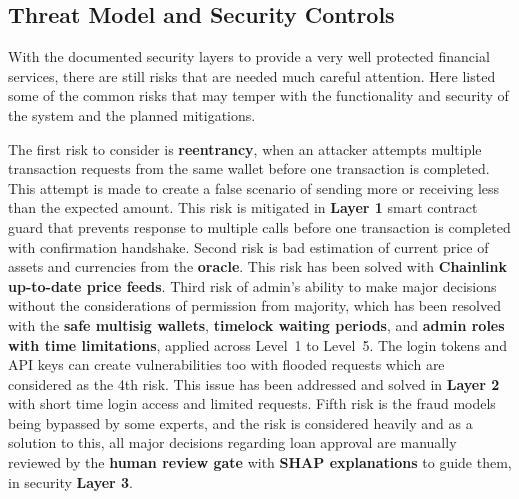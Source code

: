 \documentclass[12pt,a4paper]{report}
\begin{document}
\subsection{Threat Model and Security Controls}
\label{sec:threat-model}

With the documented security layers to provide a very well protected financial services, there are still risks that are needed much careful attention. Here listed some of the common risks that may temper with the functionality and security of the system and the planned mitigations.

The first risk to consider is \textbf{reentrancy}, when an attacker attempts multiple transaction requests from the same wallet before one transaction is completed. This attempt is made to create a false scenario of sending more or receiving less than the expected amount. This risk is mitigated in \textbf{Layer 1} smart contract guard that prevents response to multiple calls before one transaction is completed with confirmation handshake. Second risk is bad estimation of current price of assets and currencies from the \textbf{oracle}. This risk has been solved with \textbf{Chainlink up-to-date price feeds}. Third risk of admin's ability to make major decisions without the considerations of permission from majority, which has been resolved with the \textbf{safe multisig wallets}, \textbf{timelock waiting periods}, and \textbf{admin roles with time limitations}, applied across Level~1 to Level~5. The login tokens and API keys can create vulnerabilities too with flooded requests which are considered as the 4th risk. This issue has been addressed and solved in \textbf{Layer 2} with short time login access and limited requests. Fifth risk is the fraud models being bypassed by some experts, and the risk is considered heavily and as a solution to this, all major decisions regarding loan approval are manually reviewed by the \textbf{human review gate} with \textbf{SHAP explanations} to guide them, in security \textbf{Layer 3}.
\end{document}
